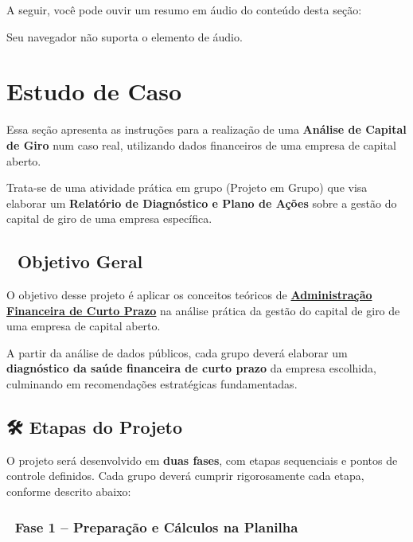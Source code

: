 \documentclass[
  a4paper,
]{book}
\begin{document}
A seguir, você pode ouvir um resumo em áudio do conteúdo desta seção:

Seu navegador não suporta o elemento de áudio.


\chapter{Estudo de Caso}\label{sec-aval}

Essa seção apresenta as instruções para a realização de uma
\textbf{Análise de Capital de Giro} num caso real, utilizando dados
financeiros de uma empresa de capital aberto.

Trata-se de uma atividade prática em grupo (Projeto em Grupo) que visa
elaborar um \textbf{Relatório de Diagnóstico e Plano de Ações} sobre a
gestão do capital de giro de uma empresa específica.

\section{🎯 Objetivo Geral}\label{objetivo-geral}

O objetivo desse projeto é aplicar os conceitos teóricos de
\hyperref[sec-giro]{\textbf{Administração Financeira de Curto Prazo}} na
análise prática da gestão do capital de giro de uma empresa de capital
aberto.

A partir da análise de dados públicos, cada grupo deverá elaborar um
\textbf{diagnóstico da saúde financeira de curto prazo} da empresa
escolhida, culminando em recomendações estratégicas fundamentadas.

\section{🛠️ Etapas do Projeto}\label{etapas-do-projeto}

O projeto será desenvolvido em \textbf{duas fases}, com etapas
sequenciais e pontos de controle definidos. Cada grupo deverá cumprir
rigorosamente cada etapa, conforme descrito abaixo:

\subsection{📌 Fase 1 -- Preparação e Cálculos na
Planilha}\label{fase-1-preparauxe7uxe3o-e-cuxe1lculos-na-planilha}
\end{document}
